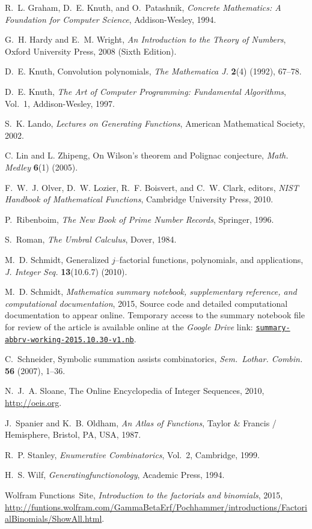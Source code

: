 \documentclass[12pt,reqno]{article}
\numberwithin{sfootnote}{section}
\numberwithin{equation}{section}
\theoremstyle{DefaultTheoremStyle}
\theoremstyle{definition}
\newcommand{\TheSummaryNBFileGoogleDriveLink}[0]{https://drive.google.com/file/d/0B6na6iIT7ICZRFltbTVVcmVpVk0/view?usp=drivesdk}
\begin{document}
\begin{thebibliography}{10}
R.~L. Graham, D.~E. Knuth, and O.~Patashnik, {\em Concrete Mathematics: A
  Foundation for Computer Science}, Addison-Wesley, 1994.

G.~H. Hardy and E.~M. Wright, {\em An Introduction to the Theory of
  Numbers}, Oxford University Press, 2008 (Sixth Edition).

D.~E. Knuth, Convolution polynomials, {\em The Mathematica J.} {\bf 2}(4)
  (1992), 67--78.

D.~E. Knuth, {\em The Art of Computer Programming: Fundamental Algorithms},
  Vol.~1, Addison-Wesley, 1997.

S.~K. Lando, {\em Lectures on Generating Functions}, American Mathematical
  Society, 2002.

C. Lin and L. Zhipeng, On {W}ilson's theorem and {P}olignac conjecture, {\em
  Math. Medley} {\bf 6}(1) (2005).

F.~W.~J. Olver, D.~W. Lozier, R.~F. Boisvert, and C.~W. Clark,
  editors, {\em {NIST} Handbook of Mathematical Functions}, Cambridge
  University Press, 2010.

P.~Ribenboim, {\em The New Book of Prime Number Records}, Springer, 1996.

S.~Roman, {\em The Umbral Calculus}, Dover, 1984.

M.~D. Schmidt, Generalized $j$--factorial functions, polynomials, and
  applications, {\em J. Integer Seq.} {\bf 13}(10.6.7) (2010).

M.~D. Schmidt, {\em Mathematica summary notebook, 
supplementary reference, and computational documentation}, 2015, 
Source code and detailed computational documentation to appear online. 
Temporary access to the summary notebook file for review of the article 
is available online at the {\em Google Drive} link: 
\href{\TheSummaryNBFileGoogleDriveLink}{\texttt{summary-abbrv-working-2015.10.30-v1.nb}}. 

C.~Schneider, Symbolic summation assists combinatorics, {\em Sem.~Lothar.
  Combin.} {\bf 56} (2007), 1--36.

N.~J.~A. Sloane, The {O}nline {E}ncyclopedia of {I}nteger {S}equences, 2010, 
\url{http://oeis.org}. 

J.~Spanier and K.~B. Oldham, {\em An Atlas of Functions}, Taylor \&
  Francis / Hemisphere, Bristol, PA, USA, 1987.

R.~P. Stanley, {\em Enumerative Combinatorics}, Vol.~2, Cambridge, 1999.

H.~S. Wilf, {\em Generatingfunctionology}, Academic Press, 1994.

{W}olfram Functions~Site, 
{\em Introduction to the factorials and binomials}, 2015, 
\url{http://funtions.wolfram.com/GammaBetaErf/Pochhammer/introductions/FactorialBinomials/ShowAll.html}.

\end{thebibliography}
\end{document}
